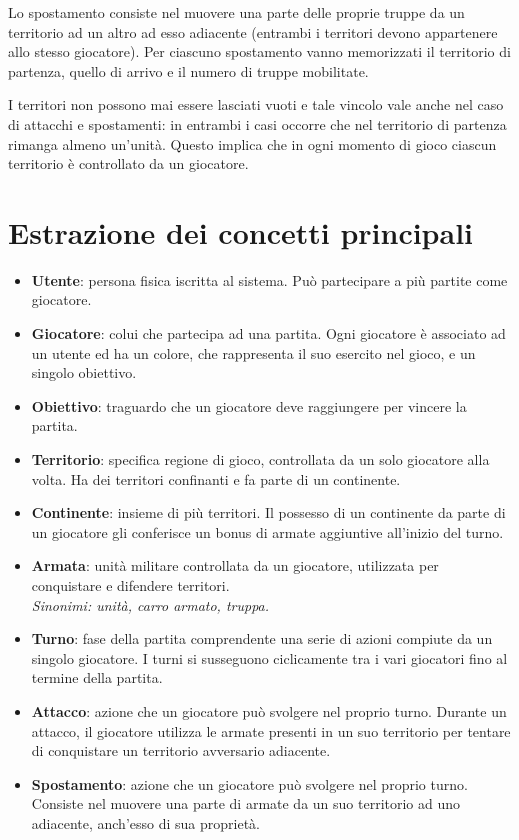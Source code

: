 \documentclass[a4paper,12pt]{report}
\begin{document}
Lo spostamento consiste nel muovere una parte delle proprie truppe da un territorio ad un altro ad esso adiacente (entrambi i territori devono appartenere allo stesso giocatore). Per ciascuno spostamento vanno memorizzati il territorio di partenza, quello di arrivo e il numero di truppe mobilitate. \par
I territori non possono mai essere lasciati vuoti e tale vincolo vale anche nel caso di attacchi e spostamenti: in entrambi i casi occorre che nel territorio di partenza rimanga almeno un’unità. Questo implica che in ogni momento di gioco ciascun territorio è controllato da un giocatore.

\section{Estrazione dei concetti principali}

\begin{itemize}
    \item \textbf{Utente}: persona fisica iscritta al sistema. Può partecipare a più partite come giocatore.
    \item \textbf{Giocatore}: colui che partecipa ad una partita. Ogni giocatore è associato ad un utente ed ha un colore, che rappresenta il suo esercito nel gioco, e un singolo obiettivo.
    \item \textbf{Obiettivo}: traguardo che un giocatore deve raggiungere per vincere la partita.
    \item \textbf{Territorio}: specifica regione di gioco, controllata da un solo giocatore alla volta. Ha dei territori confinanti e fa parte di un continente.
    \item \textbf{Continente}: insieme di più territori. Il possesso di un continente da parte di un giocatore gli conferisce un bonus di armate aggiuntive all’inizio del turno.
    \item \textbf{Armata}: unità militare controllata da un giocatore, utilizzata per conquistare e difendere territori. \\\textit{Sinonimi: unità, carro armato, truppa.}
    \item \textbf{Turno}: fase della partita comprendente una serie di azioni compiute da un singolo giocatore. I turni si susseguono ciclicamente tra i vari giocatori fino al termine della partita.
    \item \textbf{Attacco}: azione che un giocatore può svolgere nel proprio turno. Durante un attacco, il giocatore utilizza le armate presenti in un suo territorio per tentare di conquistare un territorio avversario adiacente.
    \item \textbf{Spostamento}: azione che un giocatore può svolgere nel proprio turno. Consiste nel muovere una parte di armate da un suo territorio ad uno adiacente, anch’esso di sua proprietà.

\end{itemize}
\end{document}
